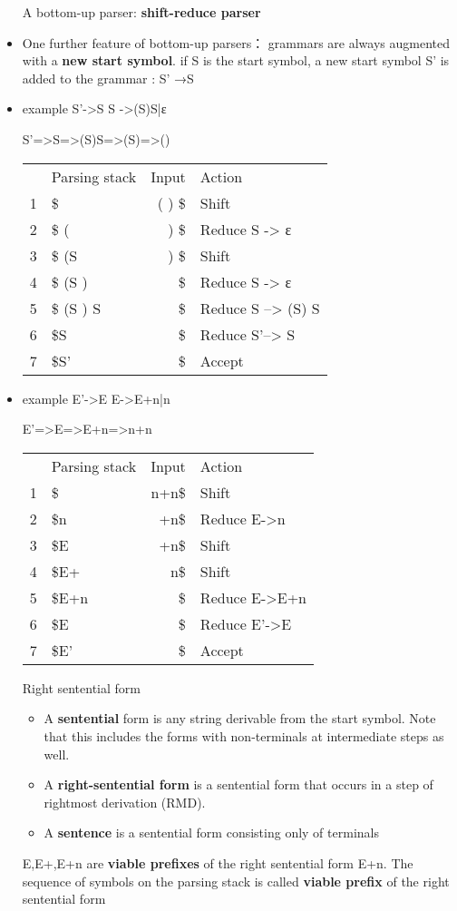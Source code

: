 \documentclass[11pt]{article}
\begin{document}
\begin{itemize}
A bottom-up parser: \textbf{shift-reduce parser}
\item One further feature of bottom-up parsers： grammars are always augmented
with a \textbf{new start symbol}. if S is the start symbol, a new start symbol S' is
added to the grammar :  S' →S

\item example
S'->S
S ->(S)S|ε

S'=>S=>(S)S=>(S)=>()
\begin{center}
\begin{tabular}{rlrl}
 & Parsing stack & Input & Action\\
1 & \$ & ( ) \$ & Shift\\
2 & \$ ( & ) \$ & Reduce  S -> ε\\
3 & \$ (S & ) \$ & Shift\\
4 & \$ (S ) & \$ & Reduce  S -> ε\\
5 & \$ (S ) S & \$ & Reduce S --> (S) S\\
6 & \$S & \$ & Reduce S'--> S\\
7 & \$S' & \$ & Accept\\
\end{tabular}
\end{center}

\item example
E'->E
E->E+n|n

E'=>E=>E+n=>n+n
\begin{center}
\begin{tabular}{rlrl}
 & Parsing stack & Input & Action\\
1 & \$ & n+n\$ & Shift\\
2 & \$n & +n\$ & Reduce  E->n\\
3 & \$E & +n\$ & Shift\\
4 & \$E+ & n\$ & Shift\\
5 & \$E+n & \$ & Reduce E->E+n\\
6 & \$E & \$ & Reduce E'->E\\
7 & \$E' & \$ & Accept\\
\end{tabular}
\end{center}
\item[{Right sentential form}] \begin{itemize}
\item A \textbf{sentential} form is any string derivable from the start symbol. Note
that this includes the forms with non-terminals at intermediate steps as
well.
\item A \textbf{right-sentential form} is a sentential form that occurs in a step of
rightmost derivation (RMD).
\item A \textbf{sentence} is a sentential form consisting only of terminals
\end{itemize}

E,E+,E+n are \textbf{viable prefixes} of the right sentential form E+n.
The sequence of symbols on the parsing stack is called \textbf{viable prefix} of the
right sentential form
\end{itemize}
\end{document}
